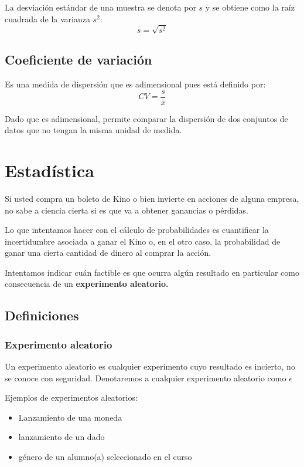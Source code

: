 \documentclass[12pt,twocolumn,a4paper]{report}
\begin{document}
La desviación estándar de una muestra se denota por $s$ y se obtiene como la raíz cuadrada de la varianza $s^2$: $$s = \sqrt{s^2} $$

\section*{Coeficiente de variación}
Es una medida de dispersión que es adimensional pues está definido por: $$ CV = \frac{s}{\bar{x}} $$

Dado que es adimensional, permite comparar la dispersión de dos conjuntos de datos que no tengan la misma unidad de medida. 




\chapter*{Estadística}

Si usted compra un boleto de Kino o bien invierte en acciones de alguna empresa, no sabe a ciencia cierta si es que va a obtener ganancias o pérdidas. 

Lo que intentamos hacer con el cálculo de probabilidades es cuantificar la incertidumbre asociada a ganar el Kino o, en el otro caso, la probabilidad de ganar una cierta cantidad de dinero al comprar la acción. 

Intentamos indicar cuán factible es que ocurra algún resultado en particular como consecuencia de un \textbf{experimento aleatorio.}

\section*{Definiciones}

\subsection*{Experimento aleatorio}
Un experimento aleatorio es cualquier experimento cuyo resultado es incierto, no se conoce con seguridad. Denotaremos a cualquier experimento aleatorio como $\epsilon$

Ejemplos de experimentos aleatorios:
\begin{itemize}
\setlength\itemsep{0.001cm}
\item{Lanzamiento de una moneda}
\item{lanzamiento de un dado}
\item{género de un alumno(a) seleccionado en el curso}
\end{itemize}
\end{document}
